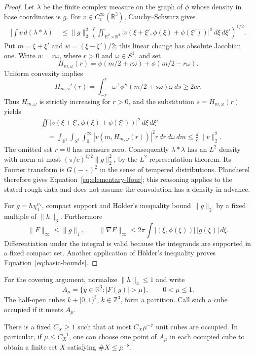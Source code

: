 \begin{proof}
Let $\lambda$ be the finite complex measure on the graph of $\phi$
whose density in base coordinates is $g$.  For
$v\in C_c^\infty(\mathbb R^3)$, Cauchy--Schwarz gives
\begin{align*}
 \left|\int v\,d(\lambda*\lambda)\right|
 &\leq \|g\|_2^2
 \left(\iint_{\mathbb R^2\times\mathbb R^2}
 |v(\xi+\xi',\phi(\xi)+\phi(\xi'))|^2\,d\xi\,d\xi'\right)^{1/2}.
\end{align*}
Put $m=\xi+\xi'$ and $w=(\xi-\xi')/2$; this linear change
has absolute Jacobian one.  Write $w=r\omega$, where
$r>0$ and $\omega\in S^1$, and set
\[
 H_{m,\omega}(r)=\phi(m/2+r\omega)+\phi(m/2-r\omega).
\]
Uniform convexity implies
\[
 H_{m,\omega}'(r)
 =\int_{-r}^{r}\omega^{\mathsf T}\phi''(m/2+s\omega)
                                      \omega\,ds
 \geq2cr.
\]
Thus $H_{m,\omega}$ is strictly increasing for $r>0$, and the
substitution $s=H_{m,\omega}(r)$ yields
\begin{align*}
 &\iint |v(\xi+\xi',\phi(\xi)+\phi(\xi'))|^2\,d\xi\,d\xi'
 \\
 &\quad=\int_{\mathbb R^2}\int_{S^1}\int_0^\infty
        |v(m,H_{m,\omega}(r))|^2r\,dr\,d\omega\,dm
 \leq\frac{\pi}{c}\|v\|_2^2.
\end{align*}
The omitted set $r=0$ has measure zero.  Consequently
$\lambda*\lambda$ has an $L^2$ density with norm at most
$(\pi/c)^{1/2}\|g\|_2^2$, by the $L^2$ representation theorem.
Its Fourier transform is $G(-\,\cdot)^2$ in the sense of
tempered distributions.  Plancherel therefore gives
Equation~\eqref{eq:elementary-lfour}; this reasoning applies to the
stated rough data and does not assume the convolution has a density
in advance.

For $g=h\chi_1^{\nu_*}$, compact support and H\"older's inequality
bound $\|g\|_2$ by a fixed multiple of $\|h\|_3$.
Furthermore
\[
 \|F\|_\infty\leq\|g\|_1,\qquad
 \|\nabla F\|_\infty
 \leq2\pi\int |(\xi,\phi(\xi))|\,|g(\xi)|\,d\xi.
\]
Differentiation under the integral is valid because the integrands
are supported in a fixed compact set.  Another application of
H\"older's inequality proves Equation~\eqref{eq:basic-bounds}.
\end{proof}

For the covering argument, normalize $\|h\|_3\leq1$ and write
\[
 A_\mu=\{y\in\mathbb R^3:|F(y)|>\mu\},\qquad 0<\mu\leq1.
\]
The half-open cubes $k+[0,1)^3$, $k\in\mathbb Z^3$, form a partition.
Call such a cube occupied if it meets $A_\mu$.

\begin{lemma}\label{lem:occupancy}
There is a fixed $C_X\geq1$ such that at most $C_X\mu^{-7}$ unit
cubes are occupied.  In particular, if $\mu\leq C_X^{-1}$, one can
choose one point of $A_\mu$ in each occupied cube to obtain a finite
set $X$ satisfying $\#X\leq\mu^{-8}$.
\end{lemma}

